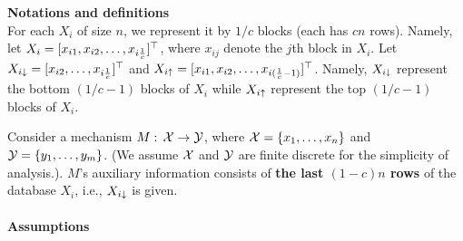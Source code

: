 \documentclass[11pt]{article}
\begin{document}
\\
\\
{\bf Notations and definitions}\\
For each $X_i$ of size $n$, we represent it by $1/c$ blocks (each has $cn$ rows). Namely, let $X_{i}=[x_{i 1}, x_{i 2} , \dots, x_{i \frac{1}{c}}]^{\top}$, where $x_{ij}$ denote the $j$th block in $X_{i}$. Let $X_{i \downarrow} = [x_{i 2} , \dots, x_{i \frac{1}{c}}]^{\top}$ and $X_{i \uparrow} = [x_{i 1}, x_{i2} , \dots, x_{i (\frac{1}{c}-1)}]^{\top}$. Namely, $X_{i \downarrow}$ represent the bottom $(1/c -1)$ blocks of $X_{i}$ while $X_{i \uparrow}$ represent the top $(1/c-1)$ blocks of $X_{i}$.

Consider a mechanism $M: \, {\cal X} \rightarrow {\cal Y}$, where ${\cal X} = \{x_{1}, \dots , x_{n}\}$ and ${\cal Y}=\{y_{1}, \dots , y_{m}\}$. (We assume $\cal X$ and $\cal Y$ are finite discrete for the simplicity of analysis.). $M$'s auxiliary information consists of {\bf the last $(1-c)n$ rows} of the database $X_{i}$, i.e., $X_{i \downarrow}$ is given. 
\\
\\
{\bf Assumptions}
\end{document}
